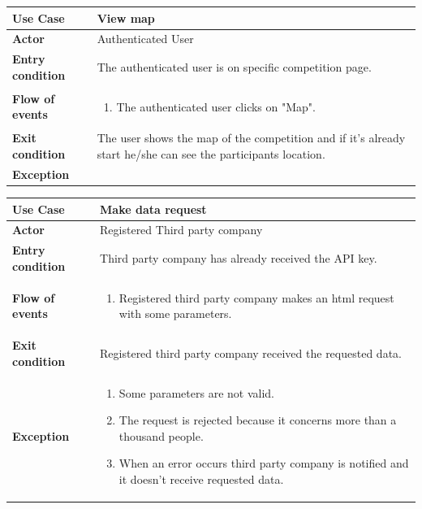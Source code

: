 \documentclass[../main.tex]{subfiles}
\begin{document}
	\vspace*{3cm}
	\begin{center}
		\begin{tabular}{p{3cm}p{8.28cm}}
			\hline
			\textbf{Use Case} & View map\\
			\hline
			\textbf{Actor} & Authenticated User\\
			\hline
			\textbf{Entry condition} & The authenticated user is on specific competition page.\\
			\hline
			\textbf{Flow of events} & \begin{enumerate}
				\linespread{0}\item The authenticated user clicks on "Map".
			\end{enumerate}\\
			\hline
			\textbf{Exit condition} & The user shows the map of the competition and if it's already start he/she can see the participants location.\\
			\hline
			\textbf{Exception}\\
			\hline
		\end{tabular}
	\end{center}
	\vspace*{3cm}
	\begin{center}
		\begin{tabular}{p{3cm}p{8.28cm}}
			\hline
			\textbf{Use Case} & Make data request\\
			\hline
			\textbf{Actor} & Registered Third party company\\
			\hline
			\textbf{Entry condition} & Third party company has already received the API key.\\
			\hline
			\textbf{Flow of events} & \begin{enumerate}
				\linespread{0}\item Registered third party company makes an html request with some parameters.
			\end{enumerate}\\
			\hline
			\textbf{Exit condition} & Registered third party company received the requested data.\\
			\hline
			\textbf{Exception} & \begin{enumerate}
				\linespread{0}\item Some parameters are not valid.
				\linespread{0}\item The request is rejected because it concerns more than a thousand people. 
				\linespread{0}\item When an error occurs third party company is notified and it doesn't receive requested data. 
			\end{enumerate}\\
			\hline
		\end{tabular}
	\end{center}
\end{document}
